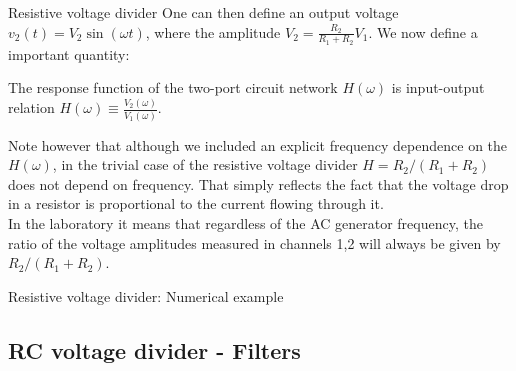 \begin{frame}{Resistive voltage divider}
One can then define an output voltage $v_2(t)=V_2\sin(\omega t)$, where the amplitude $V_2=\frac{R_2}{R_1+R_2}V_1$. We now define a important quantity:
\begin{definition}
The response function of the two-port circuit network $H(\omega)$ is input-output relation $H(\omega)\equiv\frac{V_2(\omega)}{V_1(\omega)}$.
\end{definition}
Note however that although we included an explicit frequency dependence on the $H(\omega)$, in the trivial case of the resistive voltage divider $H=R_2/(R_1+R_2)$ does not depend on frequency. That simply reflects the fact that the voltage drop in a resistor is proportional to the current flowing through it.\\ In the laboratory it means that regardless of the AC generator frequency, the ratio of the voltage amplitudes measured in channels 1,2 will always be given by  $R_2/(R_1+R_2)$.
%			
\end{frame}

\begin{frame}{Resistive voltage divider: Numerical example}

\end{frame}

\subsection{RC voltage divider - Filters}

